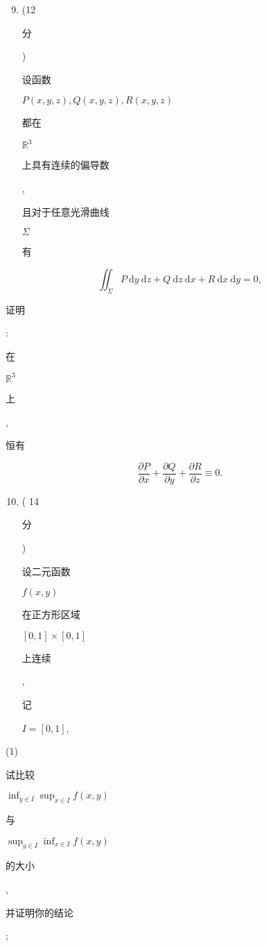 \documentclass[10pt]{article}
\begin{document}
\begin{enumerate}
  \setcounter{enumi}{8}
  \item (12 \begin{CJK}{UTF8}{mj}分\end{CJK}) \begin{CJK}{UTF8}{mj}设函数\end{CJK} $P(x, y, z), Q(x, y, z), R(x, y, z)$ \begin{CJK}{UTF8}{mj}都在\end{CJK} $\mathbb{R}^{3}$ \begin{CJK}{UTF8}{mj}上具有连续的偏导数\end{CJK}, \begin{CJK}{UTF8}{mj}且对于任意光滑曲线\end{CJK} $\Sigma$ \begin{CJK}{UTF8}{mj}有\end{CJK}
\end{enumerate}
$$
\iint_{\Sigma} P \mathrm{~d} y \mathrm{~d} z+Q \mathrm{~d} z \mathrm{~d} x+R \mathrm{~d} x \mathrm{~d} y=0,
$$
\begin{CJK}{UTF8}{mj}证明\end{CJK}: \begin{CJK}{UTF8}{mj}在\end{CJK} $\mathbb{R}^{3}$ \begin{CJK}{UTF8}{mj}上\end{CJK}, \begin{CJK}{UTF8}{mj}恒有\end{CJK}
$$
\frac{\partial P}{\partial x}+\frac{\partial Q}{\partial y}+\frac{\partial R}{\partial z} \equiv 0 .
$$

\begin{enumerate}
  \setcounter{enumi}{9}
  \item ( 14 \begin{CJK}{UTF8}{mj}分\end{CJK}) \begin{CJK}{UTF8}{mj}设二元函数\end{CJK} $f(x, y)$ \begin{CJK}{UTF8}{mj}在正方形区域\end{CJK} $[0,1] \times[0,1]$ \begin{CJK}{UTF8}{mj}上连续\end{CJK}, \begin{CJK}{UTF8}{mj}记\end{CJK} $I=[0,1]$,
\end{enumerate}
(1) \begin{CJK}{UTF8}{mj}试比较\end{CJK} $\inf _{y \in I} \sup _{x \in I} f(x, y)$ \begin{CJK}{UTF8}{mj}与\end{CJK} $\sup _{y \in I} \inf _{x \in I} f(x, y)$ \begin{CJK}{UTF8}{mj}的大小\end{CJK}, \begin{CJK}{UTF8}{mj}并证明你的结论\end{CJK};
\end{document}
